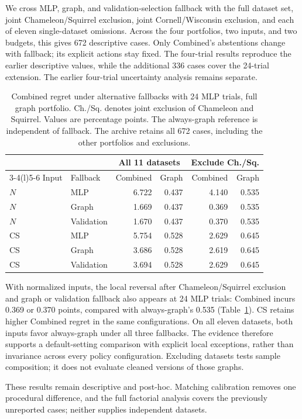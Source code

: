 We cross MLP, graph, and validation-selection fallback with the full dataset set, joint Chameleon/Squirrel exclusion, joint Cornell/Wisconsin exclusion, and each of eleven single-dataset omissions. Across the four portfolios, two inputs, and two budgets, this gives 672 descriptive cases. Only Combined's abstentions change with fallback; its explicit actions stay fixed. The four-trial results reproduce the earlier descriptive values, while the additional 336 cases cover the 24-trial extension. The earlier four-trial uncertainty analysis remains separate.

\begin{table}[tbp]
\centering
\caption{Combined regret under alternative fallbacks with 24 MLP trials, full graph portfolio. Ch./Sq. denotes joint exclusion of Chameleon and Squirrel. Values are percentage points. The always-graph reference is independent of fallback. The archive retains all 672 cases, including the other portfolios and exclusions.}
\label{tab:mlp24_fallback}
\small
\setlength{\tabcolsep}{3.5pt}
\begin{tabular}{@{}llrrrr@{}}
\toprule
 & & \multicolumn{2}{c}{All 11 datasets} & \multicolumn{2}{c}{Exclude Ch./Sq.} \\
\cmidrule(lr){3-4}\cmidrule(l){5-6}
Input & Fallback & Combined & Graph & Combined & Graph \\
\midrule
$N$ & MLP & 6.722 & 0.437 & 4.140 & 0.535 \\
$N$ & Graph & 1.669 & 0.437 & 0.369 & 0.535 \\
$N$ & Validation & 1.670 & 0.437 & 0.370 & 0.535 \\
CS & MLP & 5.754 & 0.528 & 2.629 & 0.645 \\
CS & Graph & 3.686 & 0.528 & 2.619 & 0.645 \\
CS & Validation & 3.694 & 0.528 & 2.629 & 0.645 \\
\bottomrule
\end{tabular}
\end{table}

With normalized inputs, the local reversal after Chameleon/Squirrel exclusion and graph or validation fallback also appears at 24 MLP trials: Combined incurs 0.369 or 0.370 points, compared with always-graph's 0.535 (Table~\ref{tab:mlp24_fallback}). CS retains higher Combined regret in the same configurations. On all eleven datasets, both inputs favor always-graph under all three fallbacks. The evidence therefore supports a default-setting comparison with explicit local exceptions, rather than invariance across every policy configuration. Excluding datasets tests sample composition; it does not evaluate cleaned versions of those graphs.

These results remain descriptive and post-hoc. Matching calibration removes one procedural difference, and the full factorial analysis covers the previously unreported cases; neither supplies independent datasets.
